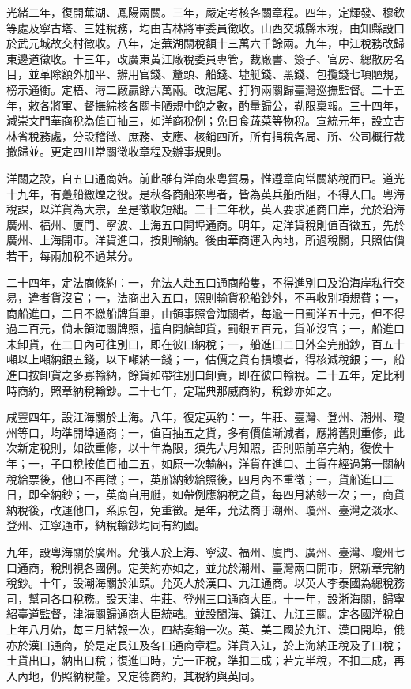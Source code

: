 \begin{pinyinscope}
光緒二年，復開蕪湖、鳳陽兩關。三年，嚴定考核各關章程。四年，定輝發、穆欽等處及寧古塔、三姓稅務，均由吉林將軍委員徵收。山西交城縣木稅，由知縣設口於武元城故交村徵收。八年，定蕪湖關稅額十三萬六千餘兩。九年，中江稅務改歸東邊道徵收。十三年，改廣東黃江廠稅委員專管，裁廠書、簽子、官房、總散房名目，並革除額外加平、辦用官錢、釐頭、船錢、墟艇錢、黑錢、包攬錢七項陋規，榜示通衢。定梧、潯二廠贏餘六萬兩。改滬尾、打狗兩關歸臺灣巡撫監督。二十五年，敕各將軍、督撫綜核各關卡陋規中飽之數，酌量歸公，勒限稟報。三十四年，減崇文門華商稅為值百抽三，如洋商稅例；免日食蔬菜等物稅。宣統元年，設立吉林省稅務處，分設稽徵、庶務、支應、核銷四所，所有捐稅各局、所、公司概行裁撤歸並。更定四川常關徵收章程及辦事規則。

洋關之設，自五口通商始。前此雖有洋商來粵貿易，惟遵章向常關納稅而已。道光十九年，有躉船繳煙之役。是秋各商船來粵者，皆為英兵船所阻，不得入口。粵海稅課，以洋貨為大宗，至是徵收短絀。二十二年秋，英人要求通商口岸，允於沿海廣州、福州、廈門、寧波、上海五口開埠通商。明年，定洋貨稅則值百徵五，先於廣州、上海開市。洋貨進口，按則輸納。後由華商運入內地，所過稅關，只照估價若干，每兩加稅不過某分。

二十四年，定法商條約：一，允法人赴五口通商船隻，不得進別口及沿海岸私行交易，違者貨沒官；一，法商出入五口，照則輸貨稅船鈔外，不再收別項規費；一，商船進口，二日不繳船牌貨單，由領事照會海關者，每逾一日罰洋五十元，但不得過二百元，倘未領海關牌照，擅自開艙卸貨，罰銀五百元，貨並沒官；一，船進口未卸貨，在二日內可往別口，即在彼口納稅；一，船進口二日外全完船鈔，百五十噸以上噸納銀五錢，以下噸納一錢；一，估價之貨有損壞者，得核減稅銀；一，船進口按卸貨之多寡輸納，餘貨如帶往別口卸賣，即在彼口輸稅。二十五年，定比利時商約，照章納稅輸鈔。二十七年，定瑞典那威商約，稅鈔亦如之。

咸豐四年，設江海關於上海。八年，復定英約：一，牛莊、臺灣、登州、潮州、瓊州等口，均準開埠通商；一，值百抽五之貨，多有價值漸減者，應將舊則重修，此次新定稅則，如欲重修，以十年為限，須先六月知照，否則照前章完納，復俟十年；一，子口稅按值百抽二五，如原一次輸納，洋貨在進口、土貨在經過第一關納稅給票後，他口不再徵；一，英船納鈔給照後，四月內不重徵；一，貨船進口二日，即全納鈔；一，英商自用艇，如帶例應納稅之貨，每四月納鈔一次；一，商貨納稅後，改運他口，系原包，免重徵。是年，允法商于潮州、瓊州、臺灣之淡水、登州、江寧通市，納稅輸鈔均同有約國。

九年，設粵海關於廣州。允俄人於上海、寧波、福州、廈門、廣州、臺灣、瓊州七口通商，稅則視各國例。定美約亦如之，並允於潮州、臺灣兩口開市，照新章完納稅鈔。十年，設潮海關於汕頭。允英人於漢口、九江通商。以英人李泰國為總稅務司，幫司各口稅務。設天津、牛莊、登州三口通商大臣。十一年，設浙海關，歸寧紹臺道監督，津海關歸通商大臣統轄。並設閩海、鎮江、九江三關。定各國洋稅自上年八月始，每三月結報一次，四結奏銷一次。英、美二國於九江、漢口開埠，俄亦於漢口通商，於是定長江及各口通商章程。洋貨入江，於上海納正稅及子口稅；土貨出口，納出口稅；復進口時，完一正稅，準扣二成；若完半稅，不扣二成，再入內地，仍照納稅釐。又定德商約，其稅約與英同。


\end{pinyinscope}
